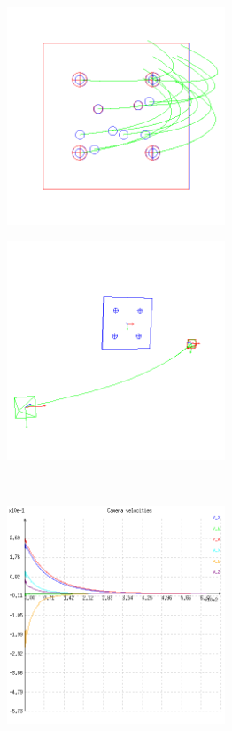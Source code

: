 \begin{figure}[ht!]
\centering
\begin{mdframed}[linecolor=black!30,backgroundcolor=black!5]
  \centering
  \begin{subfigure}{.48\textwidth}
    \centering
    \includegraphics[width=65mm]{figures/plots/ex5cimage.png}
    \caption{}
    \label{fig:ex5cimage}
  \end{subfigure}
  \begin{subfigure}{.48\textwidth}
    \centering
    \includegraphics[width=65mm]{figures/plots/ex5cscene.png}
    \caption{}
    \label{fig:ex5cscene}
  \end{subfigure}
  \\
  \begin{subfigure}{.48\textwidth}
    \centering
    \includegraphics[width=65mm]{figures/plots/ex5cvelocity.png}

\end{subfigure}
\end{mdframed}
\end{figure}
